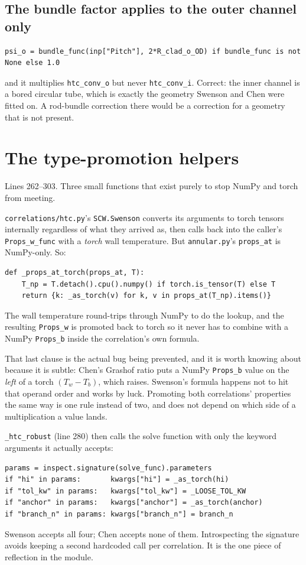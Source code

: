 \documentclass[11pt]{article}
\newcommand{\code}[1]{\texttt{#1}}
\begin{document}
\subsection{The bundle factor applies to the outer channel only}
\begin{lstlisting}
psi_o = bundle_func(inp["Pitch"], 2*R_clad_o_OD) if bundle_func is not None else 1.0
\end{lstlisting}
and it multiplies \code{htc\_conv\_o} but never \code{htc\_conv\_i}. Correct: the inner
channel is a bored circular tube, which is exactly the geometry Swenson and Chen were
fitted on. A rod-bundle correction there would be a correction for a geometry that is not
present.

\section{The type-promotion helpers}
Lines 262--303. Three small functions that exist purely to stop NumPy and torch from
meeting.

\code{correlations/htc.py}'s \code{SCW.Swenson} converts its arguments to torch tensors
internally regardless of what they arrived as, then calls back into the caller's
\code{Props\_w\_func} with a \emph{torch} wall temperature. But \code{annular.py}'s
\code{props\_at} is NumPy-only. So:

\begin{lstlisting}
def _props_at_torch(props_at, T):
    T_np = T.detach().cpu().numpy() if torch.is_tensor(T) else T
    return {k: _as_torch(v) for k, v in props_at(T_np).items()}
\end{lstlisting}
The wall temperature round-trips through NumPy to do the lookup, and the resulting
\code{Props\_w} is promoted back to torch so it never has to combine with a NumPy
\code{Props\_b} inside the correlation's own formula.

That last clause is the actual bug being prevented, and it is worth knowing about because
it is subtle: Chen's Grashof ratio puts a NumPy \code{Props\_b} value on the \emph{left}
of a torch $(T_w - T_b)$, which raises. Swenson's formula happens not to hit that operand
order and works by luck. Promoting both correlations' properties the same way is one rule
instead of two, and does not depend on which side of a multiplication a value lands.

\code{\_htc\_robust} (line 280) then calls the solve function with only the keyword
arguments it actually accepts:
\begin{lstlisting}
params = inspect.signature(solve_func).parameters
if "hi" in params:       kwargs["hi"] = _as_torch(hi)
if "tol_kw" in params:   kwargs["tol_kw"] = _LOOSE_TOL_KW
if "anchor" in params:   kwargs["anchor"] = _as_torch(anchor)
if "branch_n" in params: kwargs["branch_n"] = branch_n
\end{lstlisting}
Swenson accepts all four; Chen accepts none of them. Introspecting the signature avoids
keeping a second hardcoded call per correlation. It is the one piece of reflection in the
module.
\end{document}
